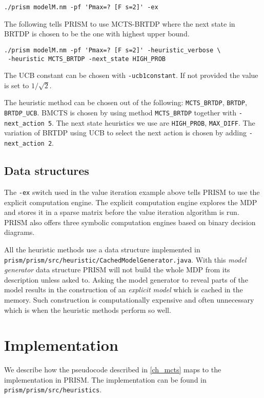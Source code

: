 \medskip
\begin{verbatim}
./prism modelM.nm -pf 'Pmax=? [F s=2]' -ex
\end{verbatim}
\medskip

The following tells PRISM to use MCTS-BRTDP where the next state in
BRTDP is chosen to be the one with highest upper bound.

\medskip
\begin{verbatim}
./prism modelM.nm -pf 'Pmax=? [F s=2]' -heuristic_verbose \
 -heuristic MCTS_BRTDP -next_state HIGH_PROB
\end{verbatim}
\medskip

The UCB constant can be chosen with
\verb|-ucb1constant|. If not provided the value is set to
$1/\sqrt{2}$.

The heuristic method can be chosen out of the following:\linebreak
\verb|MCTS_BRTDP|, \verb|BRTDP|, \verb|BRTDP_UCB|. BMCTS is chosen by
using method \verb|MCTS_BRTDP| together with \verb|-next_action 5|.
The next state heuristics we use are
\verb|HIGH_PROB|, \verb|MAX_DIFF|.
The variation of BRTDP using UCB to select the next action is chosen by
adding \verb|-next_action 2|.

\subsection*{Data structures}
The \verb|-ex| switch used in the value iteration example above tells
PRISM to use the explicit computation engine.
The explicit computation engine explores the MDP and stores it in
a sparse matrix before the value iteration algorithm is run.
PRISM also offers three symbolic computation engines based on binary decision
diagrams.

All the heuristic methods use a data structure implemented in
\verb|prism/prism/src/heuristic/CachedModelGenerator.java|.
With this {\em model generator} data structure PRISM will not build the
whole MDP from its description unless asked to.
Asking the model generator to reveal parts of the model results in the
construction of an {\em explicit model} which is cached in the memory.
Such construction is computationally expensive and often unnecessary
which is when the heuristic methods perform so well.

\section{Implementation}

We describe how the pseudocode described in \autoref{ch_mcts} maps to
the implementation in PRISM. The implementation can be found in
\verb|prism/prism/src/heuristics|.

